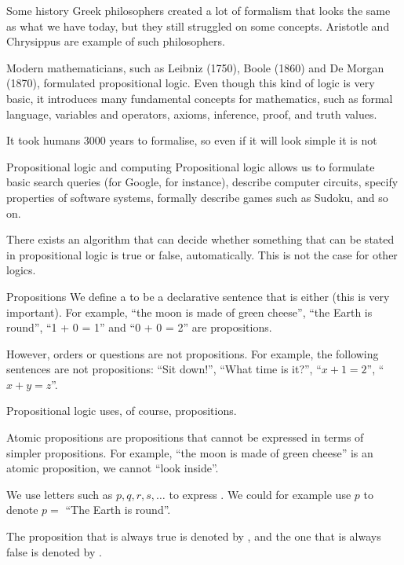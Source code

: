 \documentclass{article}
\begin{document}
\begin{parag}{Some history}
    Greek philosophers created a lot of formalism that looks the same as what we have today, but they still struggled on some concepts. Aristotle and Chrysippus are example of such philosophers. 

    Modern mathematicians, such as Leibniz (1750), Boole (1860) and De Morgan (1870), formulated propositional logic. Even though this kind of logic is very basic, it introduces many fundamental concepts for mathematics, such as formal language, variables and operators, axioms, inference, proof, and truth values. 
    
    It took humans 3000 years to formalise, so even if it will look simple it is not
\end{parag}

\begin{parag}{Propositional logic and computing}
    Propositional logic allows us to formulate basic search queries (for Google, for instance), describe computer circuits, specify properties of software systems, formally describe games such as Sudoku, and so on.

    There exists an algorithm that can decide whether something that can be stated in propositional logic is true or false, automatically. This is not the case for other logics.
\end{parag}

\begin{parag}{Propositions}
    We define a  to be a declarative sentence that is either  (this is very important). For example, ``the moon is made of green cheese'', ``the Earth is round'', ``1 + 0 = 1'' and ``0 + 0 = 2'' are propositions.

    However, orders or questions are not propositions. For example, the following sentences are not propositions: ``Sit down!'', ``What time is it?'', ``$x + 1 = 2$'', ``$x + y = z$''.

    Propositional logic uses, of course, propositions.
\end{parag}

\begin{parag}{Atomic propositions}
     are propositions that cannot be expressed in terms of simpler propositions. For example, ``the moon is made of green cheese'' is an atomic proposition, we cannot ``look inside''.

    We use letters such as $p, q, r, s, \ldots$ to express . We could for example use $p$ to denote $p = $ ``The Earth is round''. 

    The proposition that is always true is denoted by , and the one that is always false is denoted by .
\end{parag}
\end{document}
